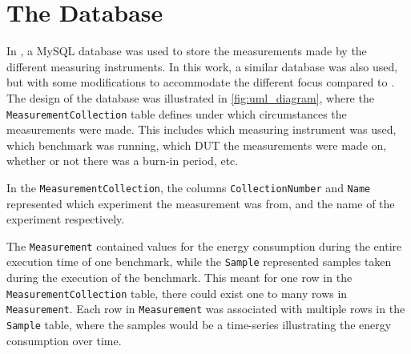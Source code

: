 \section{The Database}\label{app:database}

In \cite{biksbois}, a MySQL database was used to store the measurements made by the different measuring instruments. In this work, a similar database was also used, but with some modifications to accommodate the different focus compared to \cite{biksbois}. The design of the database was illustrated in \cref{fig:uml_diagram}, where the \texttt{MeasurementCollection} table defines under which circumstances the measurements were made. This includes which measuring instrument was used, which benchmark was running, which DUT the measurements were made on, whether or not there was a burn-in period, etc.



In the \texttt{MeasurementCollection}, the columns \texttt{CollectionNumber} and \texttt{Name} represented which experiment the measurement was from, and the name of the experiment respectively.



The \texttt{Measurement} contained values for the energy consumption during the entire execution time of one benchmark, while the \texttt{Sample} represented samples taken during the execution of the benchmark. This meant for one row in the \texttt{MeasurementCollection} table, there could exist one to many rows in \texttt{Measurement}. Each row in \texttt{Measurement} was associated with multiple rows in the \texttt{Sample} table, where the samples would be a time-series illustrating the energy consumption over time.


